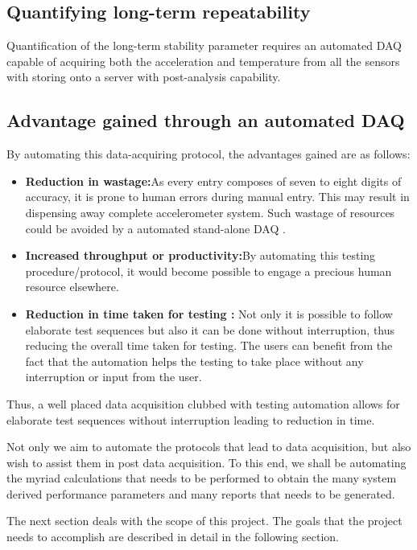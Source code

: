 \documentclass{FR16}
\begin{document}
\subsection{Quantifying long-term repeatability}
Quantification of the long-term stability parameter requires an automated DAQ capable of acquiring both the acceleration and temperature from all the sensors with storing onto a server with post-analysis capability.

\subsection{Advantage gained through an automated DAQ}
By automating this data-acquiring protocol, the advantages gained are as follows:
\begin{itemize}
    \item \textbf{Reduction in wastage:}As every entry composes of seven to eight digits of accuracy, it  is prone to human errors during manual entry. This may result in dispensing away complete accelerometer system. Such wastage of resources could be avoided by a automated stand-alone DAQ . 
   
    \item \textbf{Increased throughput or productivity:}By automating this testing procedure/protocol, it would become possible to engage a precious human resource elsewhere.
    
    \item \textbf{Reduction in time taken for testing :} Not only it is possible to follow elaborate test sequences but also it can be done without interruption, thus reducing the overall time taken for testing. The users can benefit from the fact that the automation helps the testing to take place without any interruption or input from the user.
   
\end{itemize}


Thus, a well placed data acquisition clubbed with testing automation allows for elaborate test sequences without interruption leading to reduction in time.

Not only we aim to automate the protocols that lead to data acquisition, but also wish to assist them in post data acquisition. To this end, we shall be automating the myriad calculations that needs to be performed to obtain the many system derived performance parameters and many reports that needs to be generated.

The next section deals with the scope of this project. The goals that the project needs to accomplish are described in detail in the following section.
\end{document}
